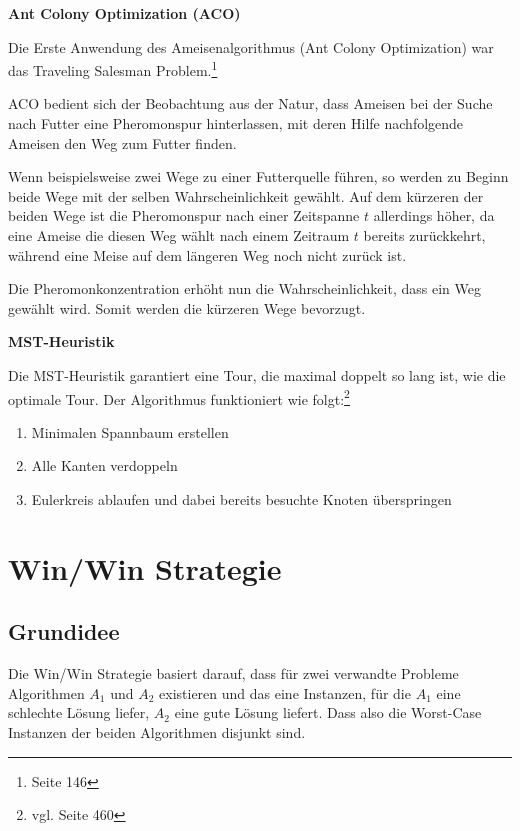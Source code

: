 \documentclass[11pt,a4paper]{article}
\begin{document}
\begin{flushleft}
\textbf{Ant Colony Optimization (ACO)}

Die Erste Anwendung des Ameisenalgorithmus (Ant Colony Optimization) war das Traveling Salesman Problem.\footnote{\cite{dorigo99} Seite 146}

ACO bedient sich der Beobachtung aus der Natur, dass Ameisen bei der Suche nach Futter eine Pheromonspur hinterlassen, mit deren Hilfe nachfolgende Ameisen den Weg zum Futter finden.

Wenn beispielsweise zwei Wege zu einer Futterquelle führen, so werden zu Beginn beide Wege mit der selben Wahrscheinlichkeit gewählt. Auf dem kürzeren der beiden Wege ist die Pheromonspur nach einer Zeitspanne $t$ allerdings höher, da eine Ameise die diesen Weg wählt nach einem Zeitraum $t$ bereits zurückkehrt, während eine Meise auf dem längeren Weg noch nicht zurück ist.

Die Pheromonkonzentration erhöht nun die Wahrscheinlichkeit, dass ein Weg gewählt wird. Somit werden die kürzeren Wege bevorzugt. \cite{dorigo99}

\end{flushleft}

\medskip

\begin{flushleft}
\textbf{MST-Heuristik}

Die MST-Heuristik garantiert eine Tour, die maximal doppelt so lang ist, wie die optimale Tour. Der Algorithmus funktioniert wie folgt:\footnote{vgl. \cite{teschl06} Seite 460}

\begin{enumerate}
    \item Minimalen Spannbaum erstellen
    \item Alle Kanten verdoppeln
    \item Eulerkreis ablaufen und dabei bereits besuchte Knoten überspringen
\end{enumerate}

\end{flushleft}
\newpage
\section{Win/Win Strategie}
\subsection{Grundidee}
Die Win/Win Strategie basiert darauf, dass für zwei verwandte Probleme Algorithmen $A_1$ und $A_2$ existieren und das eine Instanzen, für die $A_1$ eine schlechte Lösung liefer, $A_2$ eine gute Lösung liefert. Dass also die Worst-Case Instanzen der beiden Algorithmen disjunkt sind.\cite{boeckenhauer10}
\end{document}
